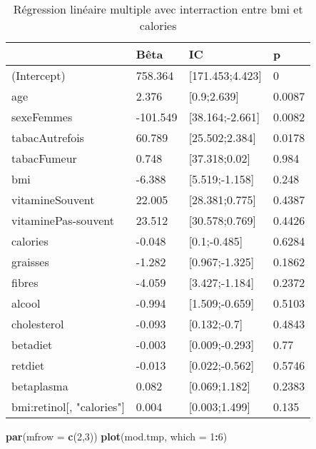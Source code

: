 \documentclass[]{article}
\newenvironment{Shaded}{\begin{snugshade}}{\end{snugshade}}
\newcommand{\KeywordTok}[1]{\textcolor[rgb]{0.13,0.29,0.53}{\textbf{#1}}}
\newcommand{\DataTypeTok}[1]{\textcolor[rgb]{0.13,0.29,0.53}{#1}}
\newcommand{\DecValTok}[1]{\textcolor[rgb]{0.00,0.00,0.81}{#1}}
\newcommand{\OperatorTok}[1]{\textcolor[rgb]{0.81,0.36,0.00}{\textbf{#1}}}
\newcommand{\NormalTok}[1]{#1}
\begin{document}
\begin{table}

\caption{\label{tab:unnamed-chunk-72}Régression linéaire multiple avec interraction entre bmi et calories}
\centering
\begin{tabular}[t]{l|l|l|l}
\hline
  & Bêta & IC & p\\
\hline
\rowcolor[HTML]{BBD2E1}  (Intercept) & 758.364 & [171.453;4.423] & 0\\
\hline
age & 2.376 & [0.9;2.639] & 0.0087\\
\hline
\rowcolor[HTML]{BBD2E1}  sexeFemmes & -101.549 & [38.164;-2.661] & 0.0082\\
\hline
tabacAutrefois & 60.789 & [25.502;2.384] & 0.0178\\
\hline
\rowcolor[HTML]{BBD2E1}  tabacFumeur & 0.748 & [37.318;0.02] & 0.984\\
\hline
bmi & -6.388 & [5.519;-1.158] & 0.248\\
\hline
\rowcolor[HTML]{BBD2E1}  vitamineSouvent & 22.005 & [28.381;0.775] & 0.4387\\
\hline
vitaminePas-souvent & 23.512 & [30.578;0.769] & 0.4426\\
\hline
\rowcolor[HTML]{BBD2E1}  calories & -0.048 & [0.1;-0.485] & 0.6284\\
\hline
graisses & -1.282 & [0.967;-1.325] & 0.1862\\
\hline
\rowcolor[HTML]{BBD2E1}  fibres & -4.059 & [3.427;-1.184] & 0.2372\\
\hline
alcool & -0.994 & [1.509;-0.659] & 0.5103\\
\hline
\rowcolor[HTML]{BBD2E1}  cholesterol & -0.093 & [0.132;-0.7] & 0.4843\\
\hline
betadiet & -0.003 & [0.009;-0.293] & 0.77\\
\hline
\rowcolor[HTML]{BBD2E1}  retdiet & -0.013 & [0.022;-0.562] & 0.5746\\
\hline
betaplasma & 0.082 & [0.069;1.182] & 0.2383\\
\hline
\rowcolor[HTML]{BBD2E1}  bmi:retinol[, "calories"] & 0.004 & [0.003;1.499] & 0.135\\
\hline
\end{tabular}
\end{table}

\begin{Shaded}
\begin{Highlighting}[]
\KeywordTok{par}\NormalTok{(}\DataTypeTok{mfrow =} \KeywordTok{c}\NormalTok{(}\DecValTok{2}\NormalTok{,}\DecValTok{3}\NormalTok{))}
\KeywordTok{plot}\NormalTok{(mod.tmp, }\DataTypeTok{which =} \DecValTok{1}\OperatorTok{:}\DecValTok{6}\NormalTok{)}
\end{Highlighting}
\end{Shaded}
\end{document}
